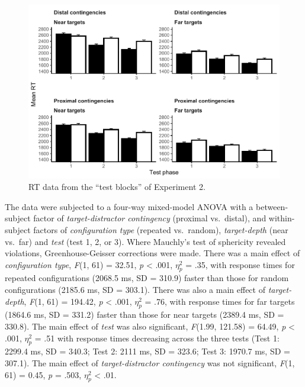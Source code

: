 \documentclass[
  english,
  man,floatsintext]{apa7}
\begin{document}
\begin{figure}

{\centering \includegraphics[width=1\linewidth]{CCVR_manuscript_files/figure-latex/Exp2-test-figure-1} 

}

\caption{RT data from the ``test blocks'' of Experiment 2.}\label{fig:Exp2-test-figure}
\end{figure}

The data were subjected to a four-way mixed-model ANOVA with a between-subject factor of \emph{target-distractor contingency} (proximal vs.~distal), and within-subject factors of \emph{configuration type} (repeated vs.~random), \emph{target-depth} (near vs.~far) and \emph{test} (test 1, 2, or 3). Where Mauchly's test of sphericity revealed violations, Greenhouse-Geisser corrections were made. There was a main effect of \emph{configuration type}, \emph{F}(1, 61) = 32.51, \emph{p} \textless{} .001, \(\eta^2_p\) = .35, with response times for repeated configurations (2068.5 ms, SD = 310.9) faster than those for random configurations (2185.6 ms, SD = 303.1). There was also a main effect of \emph{target-depth}, \emph{F}(1, 61) = 194.42, \emph{p} \textless{} .001, \(\eta^2_p\) = .76, with response times for far targets (1864.6 ms, SD = 331.2) faster than those for near targets (2389.4 ms, SD = 330.8). The main effect of \emph{test} was also significant, \emph{F}(1.99, 121.58) = 64.49, \emph{p} \textless{} .001, \(\eta^2_p\) = .51 with response times decreasing across the three tests (Test 1: 2299.4 ms, SD = 340.3; Test 2: 2111 ms, SD = 323.6; Test 3: 1970.7 ms, SD = 307.1). The main effect of \emph{target-distractor contingency} was not significant, \emph{F}(1, 61) = 0.45, \emph{p} = .503, \(\eta^2_p\) \textless{} .01.
\end{document}
